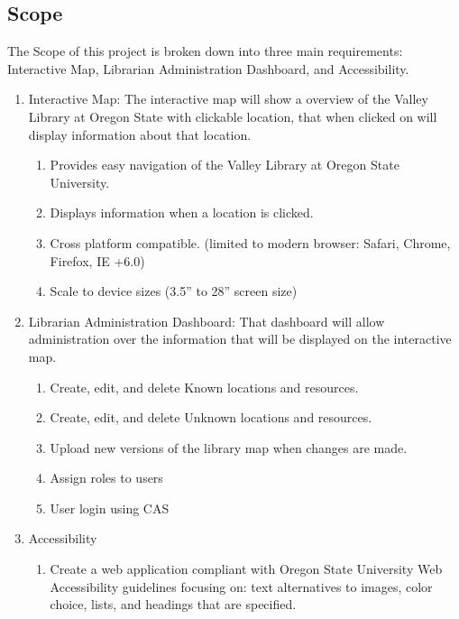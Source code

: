 \documentclass[letterpaper,10pt,titlepage, onecolumn, compsoc]{IEEEtran}
\begin{document}
\subsection{Scope}
The Scope of this project is broken down into three main requirements: Interactive Map, Librarian Administration Dashboard, and Accessibility.
\begin{enumerate} 
	\item Interactive Map: The interactive map will show a overview of the Valley Library at Oregon State with clickable location, that when clicked on will display information about that location.
    \begin{enumerate}
    	\item Provides easy navigation of the Valley Library at Oregon State University.
      	\item Displays information when a location is clicked.
    	\item Cross platform compatible. (limited to modern browser: Safari, Chrome, Firefox, IE +6.0)
    	\item Scale to device sizes (3.5” to 28” screen size)
    \end{enumerate}
	\item Librarian Administration Dashboard: That dashboard will allow administration over the information that will be displayed on the interactive map.
    \begin{enumerate}
    	\item Create, edit, and delete Known locations and resources.
        \item Create, edit, and delete Unknown locations and resources.
        \item Upload new versions of the library map when changes are made.
        \item Assign roles to users
        \item User login using CAS
    \end{enumerate}
    \item Accessibility
    \begin{enumerate}
    	\item Create a web application compliant with Oregon State University Web Accessibility guidelines focusing on: text alternatives to images, color choice, lists, and headings that are specified. 
    \end{enumerate}
\end{enumerate}

\end{document}
